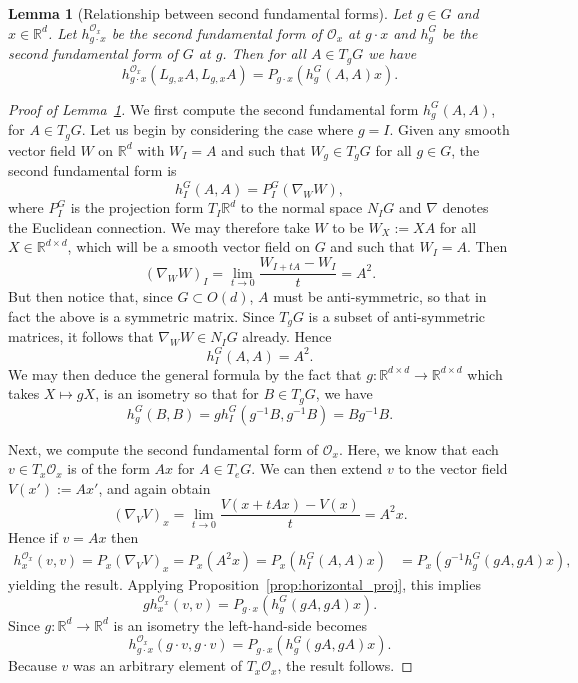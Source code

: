 \documentclass[10pt,a4paper]{amsart}
\newtheorem{lemma}{Lemma}
\newcommand\R{\mathbb{R}}
\newcommand\mc{\mathcal}
\begin{document}
\begin{lemma}[Relationship between second fundamental forms]
\label{lem:second_fund_forms_eq}
Let $g \in G$ and $x \in \R^d$.
Let $h_{g \cdot x}^{\mc O_x}$ be the second
fundamental form of $\mc O_x$ at $g \cdot x$
and $h^G_g$ be the second fundamental form
of $G$ at $g$.
Then for all $A \in T_{g} G$ we have
$$
h_{g \cdot x}^{\mc O_x} (L_{g, x}A,L_{g,x}A) = 
P_{g \cdot x}(h^G_g(A, A) x).
$$
\end{lemma}

\begin{proof}[Proof of Lemma~\ref{lem:second_fund_forms_eq}]
We first compute the second fundamental
form $h^G_g(A, A)$, for $A \in T_gG$. Let us begin
by considering the case where $g = I$. Given
any smooth vector field $W$ on $\R^d$ with
$W_I = A$ and such that $W_g \in T_gG$ for all $g\in G$, the second fundamental form is
$$
h^G_I(A, A) = P^G_I(\nabla_{W} W),
$$ where $P^G_I$ is the projection form $T_I\R^d$ to the normal
space $N_IG$ and $\nabla$ denotes the Euclidean connection.
We may therefore take $W$ to be $W_X:= XA$ for all $X \in \mathbb{R}^{d \times d}$,
which will be a 
smooth vector field on $G$ and such that $W_I = A$. Then
$$
(\nabla_{W}W)_I = \lim_{t\to 0} \frac{W_{I + tA} - W_{I}}{t}
= A^2.
$$ But then notice that, since $G \subset O(d)$, $A$ must be anti-symmetric,
so that in fact the above is a symmetric matrix. Since
$T_gG$ is a subset of anti-symmetric matrices, it follows that
$\nabla_W W \in N_IG$ already. Hence
$$
h^G_I(A, A) = A^2.
$$ We may then deduce the general formula by the fact that
$g \colon \R^{d \times d} \to \R^{d \times d}$ which takes
$X \mapsto gX$, is an isometry so that for $B \in T_gG$, we have
$$
h^G_g(B, B) = gh^G_I(g^{-1}B, g^{-1}B) = Bg^{-1}B.
$$

Next, we compute the second fundamental form of $\mc O_x$.
Here, we know that each $v \in T_x \mc O_x$ is of the form
$Ax$ for $A \in T_eG$. We can then extend $v$ to the vector
field $V(x') := Ax'$, and again obtain
$$
(\nabla_V V)_x = \lim_{t\to 0} \frac{V(x + tAx) - V(x)}{t}
= A^2x.
$$ Hence if $v = Ax$ then
\begin{align*}
h^{\mc O_x}_x(v, v)= P_x(\nabla_V V)_x = P_x(A^2x) = P_x(h^G_I(A, A)x)&=
P_x(g^{-1}h^G_g(gA, gA)x),
\end{align*}
yielding the result.
Applying Proposition~\ref{prop:horizontal_proj}, this implies
$$
gh_x^{\mc O_x}(v, v) = P_{g\cdot x}
(h_g^G(gA, gA)x).
$$ Since $g \colon \R^d \to \R^d$ is an isometry the left-hand-side
becomes
$$
h_{g\cdot x}^{\mc O_x}(g\cdot v, g \cdot v)
= P_{g\cdot x}(h_g^G(gA, gA)x).
$$ Because $v$ was an arbitrary element of $T_x \mc O_x$,
the result follows.
\end{proof}
\end{document}

